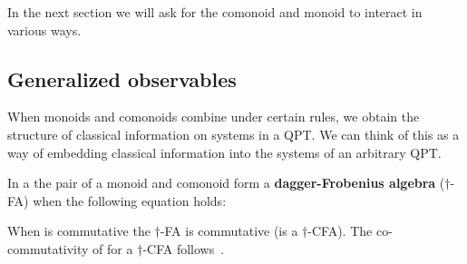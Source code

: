 In the next section we will ask for the comonoid and monoid to interact in various ways.

\subsection{Generalized observables}
\label{sec:abstractobservables}

When monoids and comonoids combine under certain rules, we obtain the structure of classical information on systems in a QPT. We can think of this as a way of embedding classical information into the systems of an arbitrary QPT.

\begin{defn}
\label{def:frobenius}
In a \dsmc the pair of a monoid  and comonoid  form a \textbf{dagger-Frobenius algebra} ($\dagger$-FA) when the following equation holds:
\begin{equation}
\label{eq:frobenius}

\end{equation}
\end{defn}
When \tinymult[whitedot] is commutative the $\dagger$-FA is commutative (is a $\dagger$-CFA). The co-commutativity of \tinycomult[whitedot] for a $\dagger$-CFA follows~\cite[Thm 3.2.8]{kissinger2012pictures}.

